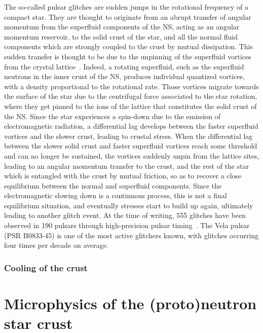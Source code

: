 The so-called pulsar glitches are sudden jumps in the rotational frequency of 
a compact star. They are thought to originate from an abrupt transfer of 
angular momentum from the superfluid components of the NS, acting as an angular 
momentum reservoir, to the solid crust of the star, and all the normal fluid
components which are strongly coupled to the crust by mutual dissipation. This
sudden transfer is thought to be due to the unpinning of the superfluid 
vortices from the crystal lattice~\cite{Anderson1975}. 
%
Indeed, a rotating superfluid, such as the superfluid neutrons in the inner 
crust of the NS, produces individual quantized vortices, with a density 
proportional to the rotational rate. Those vortices migrate towards the surface 
of the star due to the centrifugal force associated to the star rotation, where 
they get pinned to the ions of the lattice that constitutes the solid 
crust of the NS. Since the star experiences a spin-down due to the emission of 
electromagnetic radiation, a differential lag develops between the faster 
superfluid vortices and the slower crust, leading to crustal stress. 
%
When the differential lag between the slower solid crust and faster superfluid 
vortices reach some threshold and can no longer be sustained, the vortices
suddenly unpin from the lattice sites, leading to an angular momentum transfer
to the crust, and the rest of the star which is entangled with the crust by
mutual friction, so as to recover a close equilibrium between the normal and
superfluid components. Since the electromagnetic slowing down is a continuous
process, this is not a final equilibrium situation, and eventually stresses 
start to build up again, ultimately leading to another glitch event.
%
At the time of writing, 555 glitches have been observed in 190 pulsars through 
high-precision pulsar timing~\cite{Espinoza2011,Glitches}. The Vela pulsar 
(PSR B0833-45) is one of the most active glitchers known, with glitches 
occurring four times per decade on average.

\subsubsection*{Cooling of the crust}


\section*{Microphysics of the (proto)neutron star crust}


